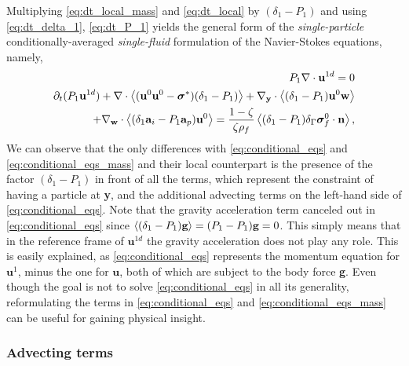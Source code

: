 Multiplying \ref{eq:dt_local_mass} and \ref{eq:dt_local} by $(\delta_1 - P_1)$ and using \ref{eq:dt_delta_1},  \ref{eq:dt_P_1} yields the general form of the \textit{single-particle} conditionally-averaged \textit{single-fluid} formulation of the Navier-Stokes equations, namely,  
\begin{align}
    P_1 \div \textbf{u}^{1d}
    = 0 
    \label{eq:conditional_eqs_mass}
    \\
    \pddt (P_1 \textbf{u}^{1d})
    + \div \avg{(\textbf{u}^0 \textbf{u}^0 - \bm\sigma^*)(\delta_1 - P_1)} 
    + \pddy\cdot\avg{(\delta_1 - P_1)\textbf{u}^0 \textbf{w}}\nonumber \\ 
    + \pddw\cdot \avg{(\delta_1\textbf{a}_i - P_1\textbf{a}_p) \textbf{u}^0}
    =  \frac{1 - \zeta}{\zeta\rho_f}\avg{ (\delta_1 - P_1) \delta_\Gamma \bm\sigma_f^0\cdot \textbf{n}},
    \label{eq:conditional_eqs}
\end{align}
We can observe that the only differences with \ref{eq:conditional_eqs} and \ref{eq:conditional_eqs_mass} and their local counterpart is the presence of the factor $(\delta_1 - P_1)$ in front of all the terms, which represent the constraint of having a particle at \textbf{y}, and the additional advecting terms on the left-hand side of \ref{eq:conditional_eqs}. 
Note that the gravity acceleration term canceled out in \ref{eq:conditional_eqs} since $\left<(\delta_1 - P_1)\textbf{g}\right> = (P_1 -P_1 )\textbf{g} =0$. 
This simply means that in the reference frame of $\textbf{u}^{1d}$ the gravity acceleration does not play any role.
This is easily explained, as \ref{eq:conditional_eqs} represents the momentum equation for $\textbf{u}^{1}$, minus the one for $\textbf{u}$, both of which are subject to the body force \textbf{g}.
Even though the goal is not to solve \ref{eq:conditional_eqs} in all its generality, reformulating the terms in \ref{eq:conditional_eqs} and \ref{eq:conditional_eqs_mass} can be useful for gaining physical insight. 

\subsubsection{Advecting terms}

